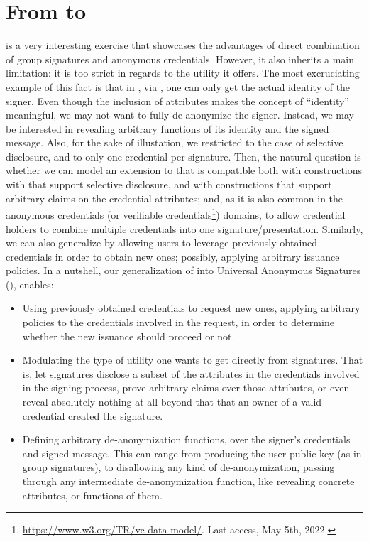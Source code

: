 \section{From \GSAC to \UAS}
\label{sec:uas}

\GSAC is a very interesting exercise that showcases the advantages of direct
combination of group signatures and anonymous credentials. However, it also
inherits a main limitation: it is too strict in regards to the utility it
offers. The most excruciating example of this fact is that in \GSAC, via \Open,
one can only get the actual identity of the signer. Even though the inclusion
of attributes makes the concept of ``identity'' meaningful, we
may not want to fully de-anonymize the signer. Instead, we may be interested in
revealing arbitrary functions of its identity and the signed message. Also, for
the sake of illustation, we restricted to the case of selective disclosure, and
to only one credential per signature. Then, the natural question is whether we
can model an extension to \GSAC that is compatible both with constructions with
that support selective disclosure, and with constructions that support arbitrary
claims on the
credential attributes; and, as it is also common in the anonymous credentials
(or verifiable credentials\footnote{\url{https://www.w3.org/TR/vc-data-model/}.
  Last access, May 5th, 2022.}) domains, to allow credential holders to
combine multiple credentials into one signature/presentation. Similarly, we can
also generalize \GSAC by allowing users to leverage previously obtained
credentials in order to obtain new ones; possibly, applying arbitrary issuance
policies. In a nutshell, our generalization of \GSAC into Universal Anonymous
Signatures (\UAS), enables:

\begin{itemize}
\item Using previously obtained credentials to request new ones, applying
  arbitrary policies to the credentials involved in the request, in
  order to determine whether the new issuance should proceed or not.
\item Modulating the type of utility one wants to get directly from signatures.
  That is, let signatures disclose a subset of the attributes in the credentials
  involved in the signing process, prove arbitrary claims over those attributes,
  or even reveal absolutely nothing at all beyond that that an owner of a valid
  credential created the signature.
\item Defining arbitrary de-anonymization functions, over the signer's
  credentials and signed message. This can range from producing the user public
  key (as in group signatures), to disallowing any kind of de-anonymization,
  passing through any intermediate de-anonymization function, like revealing
  concrete attributes, or functions of them.
\end{itemize}

